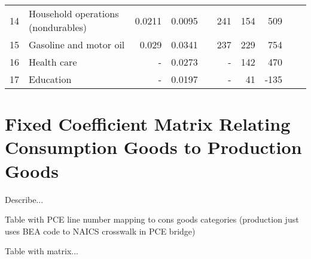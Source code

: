 \documentclass[article,11pt,letterpaper,fleqn]{article}
\theoremstyle{definition}
\numberwithin{equation}{section}
\begin{document}
\begin{table}[h!]
\begin{tabular}{rlrrrrrrrr}
    14    & Household operations (nondurables) & 0.0211 & 0.0095 &       & 241   & 154   & 509   &       &  \\
    15    & Gasoline and motor oil & 0.029 & 0.0341 &       & 237   & 229   & 754   &       &  \\
    16    & Health care & -     & 0.0273 &       & -     & 142   & 470   &       &  \\
    17    & Education & -     & 0.0197 &       & -     & 41    & -135  &       &  \\
    \hline
    \hline
    \end{tabular}%
  \label{tab:est_compare}%
\end{table}%


\section{Fixed Coefficient Matrix Relating Consumption Goods to Production Goods}

Describe...

Table with PCE line number mapping to cons goods categories (production just uses BEA code to NAICS crosswalk in PCE bridge) 

Table with matrix...



\end{document}
